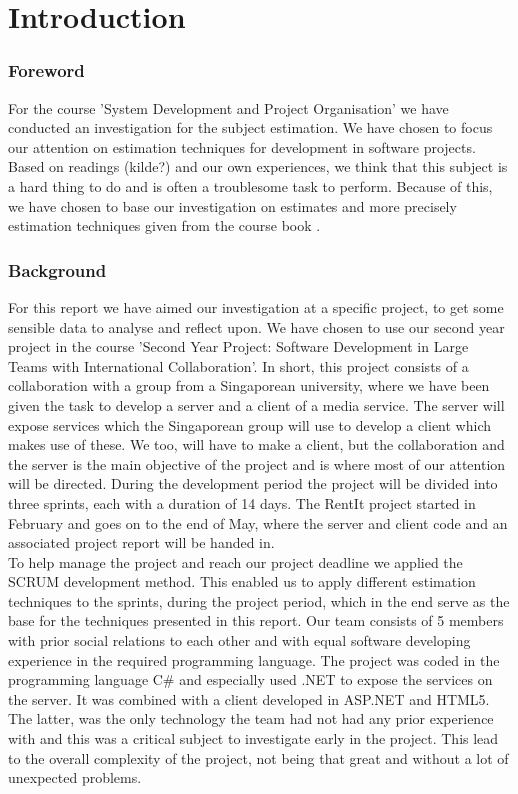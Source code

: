 \part{Introduction}
\section{Foreword}
For the course 'System Development and Project Organisation' we have conducted an investigation for the subject estimation. We have chosen to focus our attention on estimation techniques for development in software projects. Based on readings (kilde?) and our own experiences, we think that this subject is a hard thing to do and is often a troublesome task to perform. Because of this, we have chosen to base our investigation on estimates and more precisely estimation techniques given from the course book \cite{ProjectManagement_b}. 

\section{Background}
For this report we have aimed our investigation at a specific project, to get some sensible data to analyse and reflect upon. We have chosen to use our second year project in the course 'Second Year Project: Software Development in Large Teams with International Collaboration'. In short, this project consists of a collaboration with a group from a Singaporean university, where we have been given the task to develop a server and a client of a media service. The server will expose services which the Singaporean group will use to develop a client which makes use of these. We too, will have to make a client, but the collaboration and the server is the main objective of the project and is where most of our attention will be directed. During the development period the project will be divided into three sprints, each with a duration of 14 days. The RentIt project started in February and goes on to the end of May, where the server and client code and an associated project report will be handed in. \\

To help manage the project and reach our project deadline we applied the SCRUM development method. This enabled us to apply different estimation techniques to the sprints, during the project period, which in the end serve as the base for the techniques presented in this report. Our team consists of 5 members with prior social relations to each other and with equal software developing experience in the required programming language. The project was coded in the programming language C\#\cite{cSharp_w} and especially used .NET\cite{.NET_w} to expose the services on the server. It was combined with a client developed in ASP.NET\cite{ASP.NET_w} and HTML5\cite{HTML5_w}. The latter, was the only technology the team had not had any prior experience with and this was a critical subject to investigate early in the project. This lead to the overall complexity of the project, not being that great and without a lot of unexpected problems.

